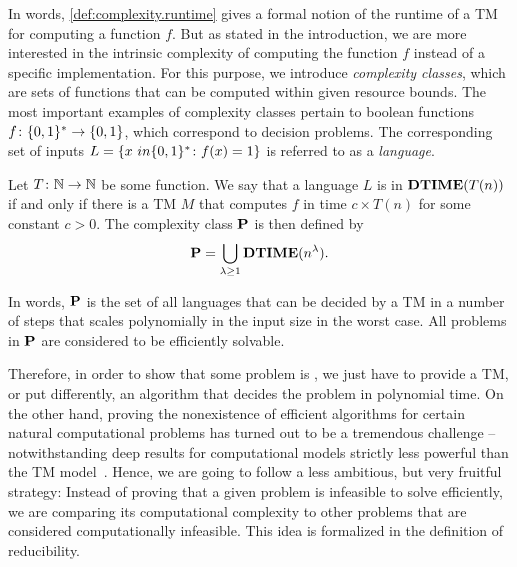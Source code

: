 
In words, \cref{def:complexity.runtime} gives a formal notion of the runtime of a TM for computing a function $f$.
But as stated in the introduction, we are more interested in the intrinsic complexity of computing the function $f$ instead of a specific implementation.
For this purpose, we introduce \emph{complexity classes}, which are sets of functions that can be computed within given resource bounds.
The most important examples of complexity classes pertain to boolean functions $f\colon \BitStrings \to \{0, 1\}$, which correspond to decision problems.
The corresponding set of  inputs $L = \{x \ in \BitStrings\colon f(x) = 1\}$ is referred to as a \emph{language}.
\begin{definition}
  \label{def:complexity.p}
  Let $T\colon \Naturals \to \Naturals$ be some function.
  We say that a language $L$ is in $\DTIME(T(n))$ if and only if there is a TM $M$ that computes $f$ in time $c \times T(n)$ for some constant $c > 0$.
  The complexity class $\P$ is then defined by
  \[
    \P = \bigcup_{\lambda \ge 1} \DTIME(n^\lambda).
  \]
\end{definition}
In words, $\P$ is the set of all languages that can be decided by a TM in a number of steps that scales polynomially in the input size in the worst case.
All problems in $\P$ are considered to be efficiently solvable.

Therefore, in order to show that some problem is , we just have to provide a TM, or put differently, an algorithm that decides the problem in polynomial time.
On the other hand, proving the nonexistence of efficient algorithms for certain natural computational problems has turned out to be a tremendous challenge -- notwithstanding deep results for computational models strictly less powerful than the TM model~\cite[Part Two]{Arora_2009_Computational}.
Hence, we are going to follow a less ambitious, but very fruitful strategy:
Instead of proving that a given problem is infeasible to solve efficiently, we are comparing its computational complexity to other problems that are considered computationally infeasible.
This idea is formalized in the definition of reducibility.

